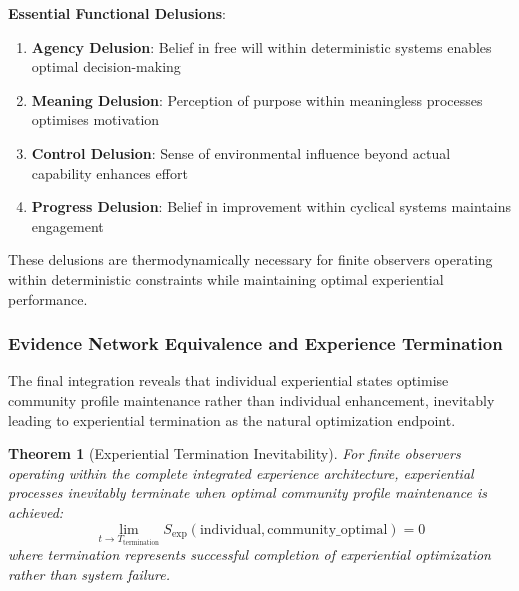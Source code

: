 \documentclass{article}
\newtheorem{theorem}{Theorem}[section]
\begin{document}
\textbf{Essential Functional Delusions}:

\begin{enumerate}
\item \textbf{Agency Delusion}: Belief in free will within deterministic systems enables optimal decision-making
\item \textbf{Meaning Delusion}: Perception of purpose within meaningless processes optimises motivation
\item \textbf{Control Delusion}: Sense of environmental influence beyond actual capability enhances effort
\item \textbf{Progress Delusion}: Belief in improvement within cyclical systems maintains engagement
\end{enumerate}

These delusions are thermodynamically necessary for finite observers operating within deterministic constraints while maintaining optimal experiential performance.

\subsubsection{Evidence Network Equivalence and Experience Termination}

The final integration reveals that individual experiential states optimise community profile maintenance rather than individual enhancement, inevitably leading to experiential termination as the natural optimization endpoint.

\begin{theorem}[Experiential Termination Inevitability]
\label{thm:experiential_termination}
For finite observers operating within the complete integrated experience architecture, experiential processes inevitably terminate when optimal community profile maintenance is achieved:
\begin{equation}
\lim_{t \to T_{\text{termination}}} S_{\text{exp}}(\text{individual}, \text{community\_optimal}) = 0
\end{equation}
where termination represents successful completion of experiential optimization rather than system failure.
\end{theorem}
\end{document}
